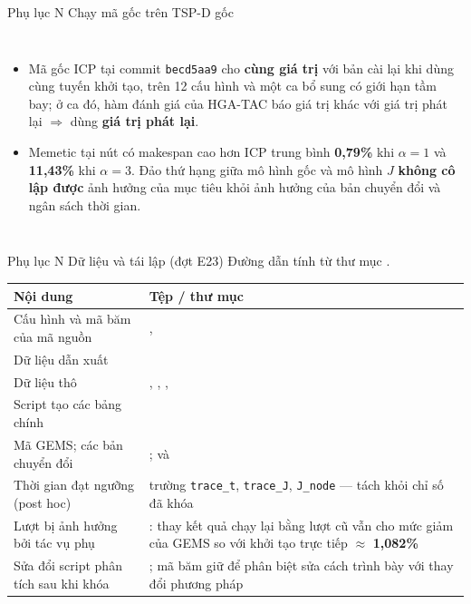 \documentclass[aspectratio=169,10pt,t,xcolor={table}]{beamer}
\newcommand{\apptitle}[2]{Phụ lục #1 \textperiodcentered{} #2}
\begin{document}
\begin{frame}{\apptitle{N}{Chạy mã gốc trên TSP-D gốc}}
\begin{columns}[T,onlytextwidth]
\begin{itemize}
\item Mã gốc ICP tại commit \texttt{becd5aa9} cho \textbf{cùng giá trị} với bản cài lại khi dùng cùng tuyến khởi tạo, trên 12 cấu hình và một ca bổ sung có giới hạn tầm bay; ở ca đó, hàm đánh giá của HGA-TAC báo giá trị khác với giá trị phát lại $\Rightarrow$ dùng \textbf{giá trị phát lại}.
\item Memetic tại nút có makespan cao hơn ICP trung bình \textbf{0,79\%} khi $\alpha=1$ và \textbf{11,43\%} khi $\alpha=3$. Đảo thứ hạng giữa mô hình gốc và mô hình $J$ \textbf{không cô lập được} ảnh hưởng của mục tiêu khỏi ảnh hưởng của bản chuyển đổi và ngân sách thời gian.
\end{itemize}
\end{columns}
\end{frame}

\begin{frame}{\apptitle{N}{Dữ liệu và tái lập (đợt E23)}}
\scriptsize Đường dẫn tính từ thư mục .
\vspace{4pt}

\renewcommand{\arraystretch}{1.3}
\begin{tabularx}{\textwidth}{@{}P{4.2cm}Y@{}}
\toprule
\textbf{Nội dung} & \textbf{Tệp / thư mục}\\\midrule
Cấu hình và mã băm của mã nguồn & , \\
Dữ liệu dẫn xuất & \\
Dữ liệu thô & , , , \\
Script tạo các bảng chính & \\
Mã GEMS; các bản chuyển đổi & ;  và \\
Thời gian đạt ngưỡng (post hoc) & trường \texttt{trace\_t}, \texttt{trace\_J}, \texttt{J\_node} --- tách khỏi chỉ số đã khóa\\
Lượt bị ảnh hưởng bởi tác vụ phụ & : thay kết quả chạy lại bằng lượt cũ vẫn cho mức giảm của GEMS so với khởi tạo trực tiếp $\approx$ \textbf{1,082\%}\\
Sửa đổi script phân tích sau khi khóa & ; mã băm giữ để phân biệt sửa cách trình bày với thay đổi phương pháp\\
\bottomrule
\end{tabularx}
\end{frame}
\end{document}
